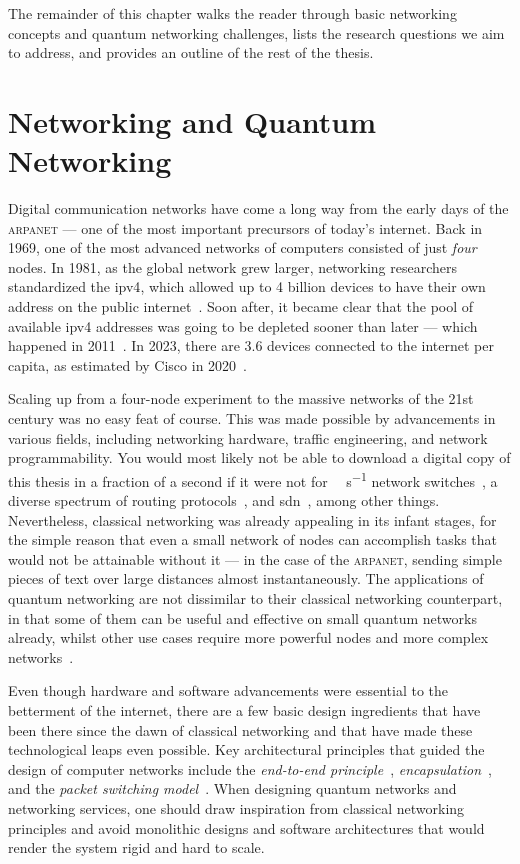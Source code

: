 The remainder of this chapter walks the reader through basic networking concepts and quantum
networking challenges, lists the research questions we aim to address, and provides an outline of
the rest of the thesis.

\section{Networking and Quantum Networking}

Digital communication networks have come a long way from the early days of the \textsc{arpanet} ---
one of the most important precursors of today's internet. Back in 1969, one of the most advanced
networks of computers consisted of just \emph{four} nodes. In 1981, as the global network grew
larger, networking researchers standardized the \acrfull{ipv4}, which allowed up to \num{4} billion
devices to have their own address on the public internet~\cite{rfc_791}. Soon after, it became clear
that the pool of available \acrshort{ipv4} addresses was going to be depleted sooner than later ---
which happened in 2011~\cite{icann_2011}. In 2023, there are \num{3.6} devices connected to the
internet per capita, as estimated by Cisco in 2020~\cite{cisco_2020}.

Scaling up from a four-node experiment to the massive networks of the 21st century was no easy feat
of course. This was made possible by advancements in various fields, including networking hardware,
traffic engineering, and network programmability. You would most likely not be able to download a
digital copy of this thesis in a fraction of a second if it were not for \unit{\tera\bit\per\second}
network switches~\cite{broadcom_tomahawk, juniper_qfx5220}, a diverse spectrum of routing
protocols~\cite{rfc_2328, rfc_4271, iso_10589}, and \acrlong{sdn}~\cite{kreutz_2014_sdn}, among
other things. Nevertheless, classical networking was already appealing in its infant stages, for the
simple reason that even a small network of nodes can accomplish tasks that would not be attainable
without it --- in the case of the \textsc{arpanet}, sending simple pieces of text over large
distances almost instantaneously. The applications of quantum networking are not dissimilar to their
classical networking counterpart, in that some of them can be useful and effective on small quantum
networks already, whilst other use cases require more powerful nodes and more complex
networks~\cite{wehner_2018_stages}.

Even though hardware and software advancements were essential to the betterment of the internet,
there are a few basic design ingredients that have been there since the dawn of classical networking
and that have made these technological leaps even possible. Key architectural principles that guided
the design of computer networks include the \emph{end-to-end principle}~\cite{saltzer_1984_end},
\emph{encapsulation}~\cite{rfc_1122}, and the \emph{packet switching
model}~\cite{roberts_1978_evolution}. When designing quantum networks and networking services, one
should draw inspiration from classical networking principles and avoid monolithic designs and
software architectures that would render the system rigid and hard to scale.

